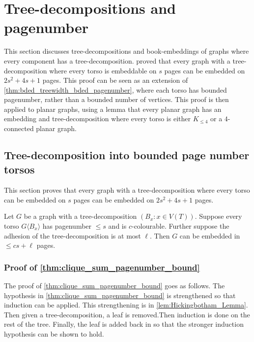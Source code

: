 \section{Tree-decompositions and pagenumber}\label{sec:BoundedPagenumber}
This section discusses tree-decompositions and book-embeddings of graphs where every component has a tree-decomposition. \textcite{hickingbothamStackNumberCliqueSum2023} proved that every graph with a tree-decomposition where every torso is embeddable on $s$ pages can be embedded on $2s^2 + 4s + 1$ pages. This proof can be seen as an extension of \cref{thm:bded_treewidth_bded_pagenumber}, where each torso has bounded pagenumber, rather than a bounded number of vertices. This proof is then applied to planar graphs, using a lemma that every planar graph has an embedding and tree-decomposition where every torso is either $K_{\leq 4}$ or a $4$-connected planar graph. 

\subsection{Tree-decomposition into bounded page number torsos}\label{ssec:Clique_sum_Pagenumber_bound}

This section proves that every graph with a tree-decomposition where every torso can be embedded on $s$ pages can be embedded on $2s^2 + 4s + 1$ pages. 

\begin{theorem}\label{thm:clique_sum_pagenumber_bound}
	Let \(G\) be a graph with a tree-decomposition \((B_x: x \in V(T))\). Suppose every torso \(G \langle B_x \rangle\) has pagenumber \(\leq s\) and is \(c\)-colourable. Further suppose the adhesion of the tree-decomposition is at most \(\ell\).
	Then $G$ can be embedded in \(\leq cs + \ell \) pages.
\end{theorem}

\subsubsection{Proof of \cref{thm:clique_sum_pagenumber_bound}}
The proof of \cref{thm:clique_sum_pagenumber_bound} goes as follows.
The hypothesis in \cref{thm:clique_sum_pagenumber_bound} is strengthened so that induction can be applied. This strengthening is in \cref{lem:Hickingbotham_Lemma}. Then given a tree-decomposition, a leaf is removed.Then induction is done on the rest of the tree. Finally, the leaf is added back in so that the stronger induction hypothesis can be shown to hold. 

